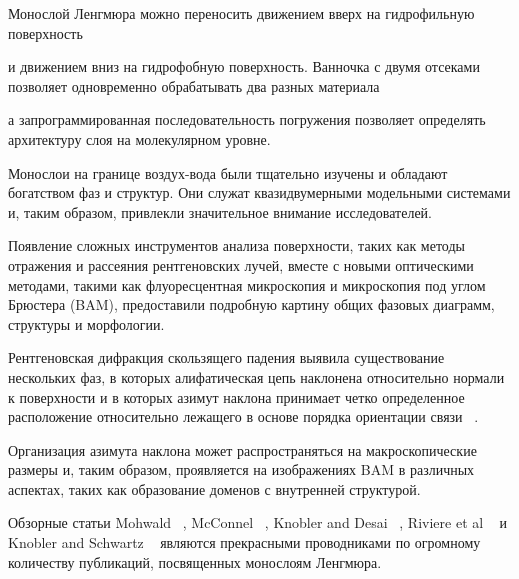 \documentclass[11pt]{article}
\begin{document}
Монослой Ленгмюра можно переносить движением вверх на гидрофильную поверхность

    \begin{center}
    \end{center}    
    
и движением вниз на гидрофобную поверхность. Ванночка с двумя отсеками позволяет одновременно обрабатывать два разных материала

    \begin{center}
    \end{center}    

 а запрограммированная последовательность погружения позволяет определять архитектуру слоя на молекулярном уровне.
 
     \begin{center}
    \end{center}  
    
  Монослои на границе воздух-вода были тщательно изучены и обладают богатством фаз и структур. Они служат квазидвумерными модельными системами и, таким образом, привлекли значительное внимание исследователей. 
  
  Появление сложных инструментов анализа поверхности, таких как методы отражения и рассеяния рентгеновских лучей, вместе с новыми оптическими методами, такими как флуоресцентная микроскопия и микроскопия под углом Брюстера (BAM), предоставили подробную картину общих фазовых диаграмм, структуры и морфологии. 
  
  Рентгеновская дифракция скользящего падения выявила существование нескольких фаз, в которых алифатическая цепь наклонена относительно нормали к поверхности и в которых азимут наклона принимает четко определенное расположение относительно лежащего в основе порядка ориентации связи ~\cite{c6}. 
  
  Организация азимута наклона может распространяться на макроскопические размеры и, таким образом, проявляется на изображениях BAM в различных аспектах, таких как образование доменов с внутренней структурой. 
  
  Обзорные статьи Mohwald ~\cite{c7}, McConnel ~\cite{c8}, Knobler and Desai ~\cite{c9}, Riviere et al ~\cite{c10} и Knobler and Schwartz ~\cite{c11} являются прекрасными проводниками по огромному количеству публикаций, посвященных монослоям Ленгмюра.
\end{document}
